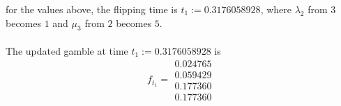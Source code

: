 \documentclass{article}
\begin{document}
for the values above, the flipping time is $t_{1}:= 0.3176058928$, where $\lambda_{2}$ from $3$ becomes $1$ and $\mu_{3}$ from $2$ becomes $5$.\\\\
The updated gamble at time $t_{1}:= 0.3176058928$ is
\begin{equation*} 
 f_{t_1}= 
 \begin{array}{|c|}
  0.024765\\
  0.059429\\
  0.177360\\
  0.177360  
 \end{array}
 \end{equation*}\\\\\\

\end{document}
